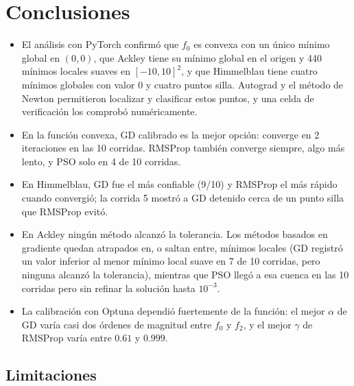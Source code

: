 \section{Conclusiones}

\begin{itemize}
    \item El análisis con PyTorch confirmó que $f_0$ es convexa con un único
    mínimo global en $(0,0)$, que Ackley tiene su mínimo global en el origen
    y 440 mínimos locales suaves en $[-10,10]^2$, y que Himmelblau tiene
    cuatro mínimos globales con valor $0$ y cuatro puntos silla. Autograd y
    el método de Newton permitieron localizar y clasificar estos puntos, y
    una celda de verificación los comprobó numéricamente.
    \item En la función convexa, GD calibrado es la mejor opción: converge
    en 2 iteraciones en las 10 corridas. RMSProp también converge siempre,
    algo más lento, y PSO solo en 4 de 10 corridas.
    \item En Himmelblau, GD fue el más confiable (9/10) y RMSProp el más
    rápido cuando convergió; la corrida 5 mostró a GD detenido cerca de un
    punto silla que RMSProp evitó.
    \item En Ackley ningún método alcanzó la tolerancia. Los métodos basados
    en gradiente quedan atrapados en, o saltan entre, mínimos locales (GD
    registró un valor inferior al menor mínimo local suave en 7 de 10
    corridas, pero ninguna alcanzó la tolerancia),
    mientras que PSO llegó a esa cuenca en las 10 corridas
    pero sin refinar la solución hasta $10^{-3}$.
    \item La calibración con Optuna dependió fuertemente de la función: el
    mejor $\alpha$ de GD varía casi dos órdenes de magnitud entre $f_0$ y
    $f_2$, y el mejor $\gamma$ de RMSProp varía entre $0.61$ y $0.999$.
\end{itemize}

\subsection{Limitaciones}
\label{sec:limitaciones}

